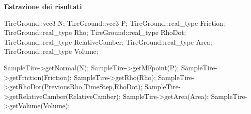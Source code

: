 \documentclass[xcolor=dvipsnames]{beamer} %
\begin{document}
\begin{frame}[fragile]
	\Large{\textbf{Estrazione dei risultati}}
	\normalsize
\begin{pseudoc}
TireGround::vec3 N;
TireGround::vec3 P;
TireGround::real_type Friction;
TireGround::real_type Rho;
TireGround::real_type RhoDot;
TireGround::real_type RelativeCamber;
TireGround::real_type Area;
TireGround::real_type Volume;

SampleTire->getNormal(N);
SampleTire->getMFpoint(P);
SampleTire->getFriction(Friction);
SampleTire->getRho(Rho);
SampleTire->getRhoDot(PreviousRho,TimeStep,RhoDot);
SampleTire->getRelativeCamber(RelativeCamber);
SampleTire->getArea(Area);
SampleTire->getVolume(Volume);
\end{pseudoc}
\end{frame}
\end{document}
